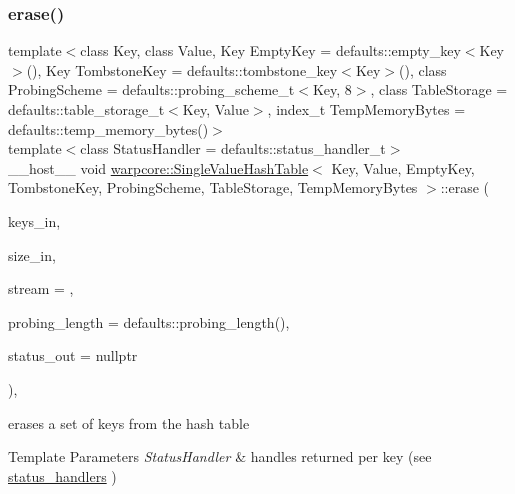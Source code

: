 \subsubsection{\texorpdfstring{erase()}{erase()}\hspace{0.1cm}{\footnotesize\ttfamily [2/2]}}
{\footnotesize\ttfamily template$<$class Key, class Value, Key Empty\+Key = defaults\+::empty\+\_\+key$<$\+Key$>$(), Key Tombstone\+Key = defaults\+::tombstone\+\_\+key$<$\+Key$>$(), class Probing\+Scheme = defaults\+::probing\+\_\+scheme\+\_\+t$<$\+Key, 8$>$, class Table\+Storage = defaults\+::table\+\_\+storage\+\_\+t$<$\+Key, Value$>$, index\+\_\+t Temp\+Memory\+Bytes = defaults\+::temp\+\_\+memory\+\_\+bytes()$>$ \\
template$<$class Status\+Handler  = defaults\+::status\+\_\+handler\+\_\+t$>$ \\
\+\_\+\+\_\+host\+\_\+\+\_\+ void \hyperlink{classwarpcore_1_1SingleValueHashTable}{warpcore\+::\+Single\+Value\+Hash\+Table}$<$ Key, Value, Empty\+Key, Tombstone\+Key, Probing\+Scheme, Table\+Storage, Temp\+Memory\+Bytes $>$\+::erase (\begin{DoxyParamCaption}\item[{key\+\_\+type $\ast$}]{keys\+\_\+in,  }\item[{index\+\_\+type}]{size\+\_\+in,  }\item[{cuda\+Stream\+\_\+t}]{stream = {},  }\item[{index\+\_\+type}]{probing\+\_\+length = {\ttfamily defaults\+:\+:probing\+\_\+length()},  }\item[{typename Status\+Handler\+::base\+\_\+type $\ast$}]{status\+\_\+out = {\ttfamily nullptr} }\end{DoxyParamCaption})\hspace{0.3cm}{\ttfamily [inline]}, {\ttfamily [noexcept]}}



erases a set of keys from the hash table 


\begin{DoxyTemplParams}{Template Parameters}
{\em Status\+Handler} & handles returned per key (see {\ttfamily \hyperlink{namespacewarpcore_1_1status__handlers}{status\+\_\+handlers}} ) \\
\hline
\end{DoxyTemplParams}

